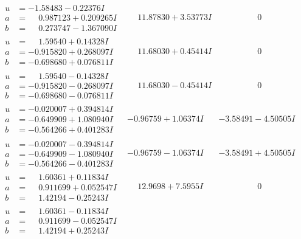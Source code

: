 \documentclass[1p]{elsarticle_modified}
\theoremstyle{definition}
\begin{document}
$$\begin{array}{c|c|c}
\begin{aligned}
u &= -1.58483 - 0.22376 I \\
a &= \phantom{-}0.987123 + 0.209265 I \\
b &= \phantom{-}0.273747 - 1.367090 I\end{aligned}
 & \phantom{-}11.87830 + 3.53773 I & \phantom{-0.000000 } 0 \\ \hline\begin{aligned}
u &= \phantom{-}1.59540 + 0.14328 I \\
a &= -0.915820 + 0.268097 I \\
b &= -0.698680 + 0.076811 I\end{aligned}
 & \phantom{-}11.68030 + 0.45414 I & \phantom{-0.000000 } 0 \\ \hline\begin{aligned}
u &= \phantom{-}1.59540 - 0.14328 I \\
a &= -0.915820 - 0.268097 I \\
b &= -0.698680 - 0.076811 I\end{aligned}
 & \phantom{-}11.68030 - 0.45414 I & \phantom{-0.000000 } 0 \\ \hline\begin{aligned}
u &= -0.020007 + 0.394814 I \\
a &= -0.649909 + 1.080940 I \\
b &= -0.564266 + 0.401283 I\end{aligned}
 & -0.96759 + 1.06374 I & -3.58491 - 4.50505 I \\ \hline\begin{aligned}
u &= -0.020007 - 0.394814 I \\
a &= -0.649909 - 1.080940 I \\
b &= -0.564266 - 0.401283 I\end{aligned}
 & -0.96759 - 1.06374 I & -3.58491 + 4.50505 I \\ \hline\begin{aligned}
u &= \phantom{-}1.60361 + 0.11834 I \\
a &= \phantom{-}0.911699 + 0.052547 I \\
b &= \phantom{-}1.42194 - 0.25243 I\end{aligned}
 & \phantom{-}12.9698 + 7.5955 I & \phantom{-0.000000 } 0 \\ \hline\begin{aligned}
u &= \phantom{-}1.60361 - 0.11834 I \\
a &= \phantom{-}0.911699 - 0.052547 I \\
b &= \phantom{-}1.42194 + 0.25243 I\end{aligned}

\end{array}$$
\end{document}
